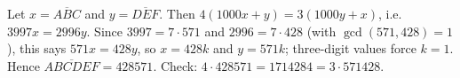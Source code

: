 Let $x=\overline{ABC}$ and $y=\overline{DEF}$. Then $4(1000x+y)=3(1000y+x)$, i.e. $3997x=2996y$. Since $3997=7\cdot571$ and $2996=7\cdot428$ (with $\gcd(571,428)=1$), this says $571x=428y$, so $x=428k$ and $y=571k$; three-digit values force $k=1$. Hence $\overline{ABCDEF}=\boxed{428571}$. Check: $4\cdot428571=1714284=3\cdot571428$.
